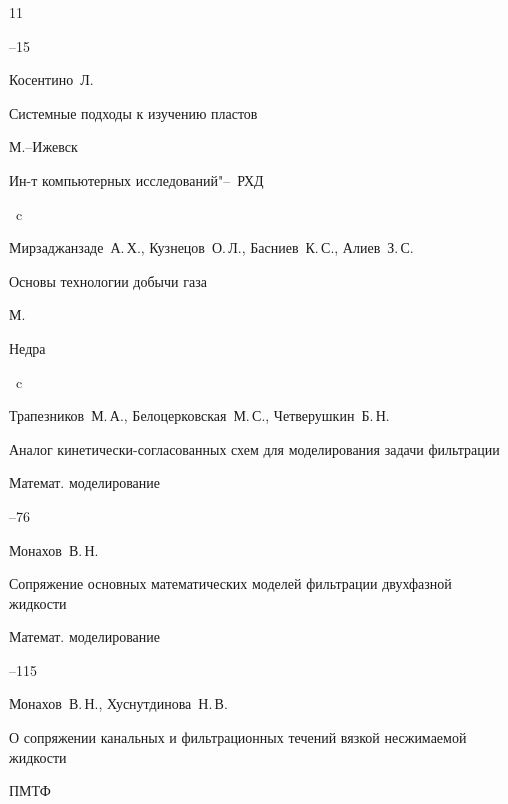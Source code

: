 \begin{thebibliography}{11}

--15




\by Косентино~Л.

\book  Системные подходы к изучению пластов

\publaddr М.--Ижевск

\publ  Ин-т компьютерных исследований"--~РХД


~c




\by Мирзаджанзаде~А.\,Х., Кузнецов~О.\,Л., Басниев~К.\,С., Алиев~З.\,С.

\book Основы технологии добычи газа

\publaddr  М.

\publ  Недра


~c




\by Трапезников~М.\,А., Белоцерковская~М.\,С., Четверушкин~Б.\,Н.

\paper Аналог кинетически-согласованных схем для моделирования задачи фильтрации

\jour Математ. моделирование




--76




\by Монахов~В.\,Н.

\paper Сопряжение основных математических моделей фильтрации двухфазной жидкости

\jour Математ. моделирование




--115




\by Монахов~В.\,Н., Хуснутдинова~Н.\,В.

\paper О сопряжении канальных и фильтрационных течений вязкой несжимаемой жидкости

\jour ПМТФ


\end{thebibliography}
